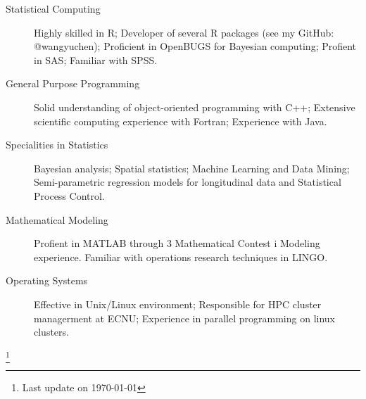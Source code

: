 \documentclass[11pt]{article}
\begin{document}
\begin{description}
	\item[Statistical Computing] Highly skilled in R; Developer of several R packages (see my GitHub: @wangyuchen); Proficient in OpenBUGS for Bayesian computing; Profient in SAS; Familiar with SPSS.
	\item[General Purpose Programming] Solid understanding of object-oriented programming with C++; Extensive scientific computing experience with Fortran; Experience with Java.
	\item[Specialities in Statistics] Bayesian analysis; Spatial statistics; Machine Learning and Data Mining; Semi-parametric regression models for longitudinal data and Statistical Process Control.
	\item[Mathematical Modeling] Profient in MATLAB through 3 Mathematical Contest i Modeling experience. Familiar with operations research techniques in LINGO.
	\item[Operating Systems] Effective in Unix/Linux environment; Responsible for HPC cluster managerment at ECNU; Experience in parallel programming on linux clusters.
\end{description}

\let\thefootnote\relax\footnote{Last update on \today}
\end{document}
